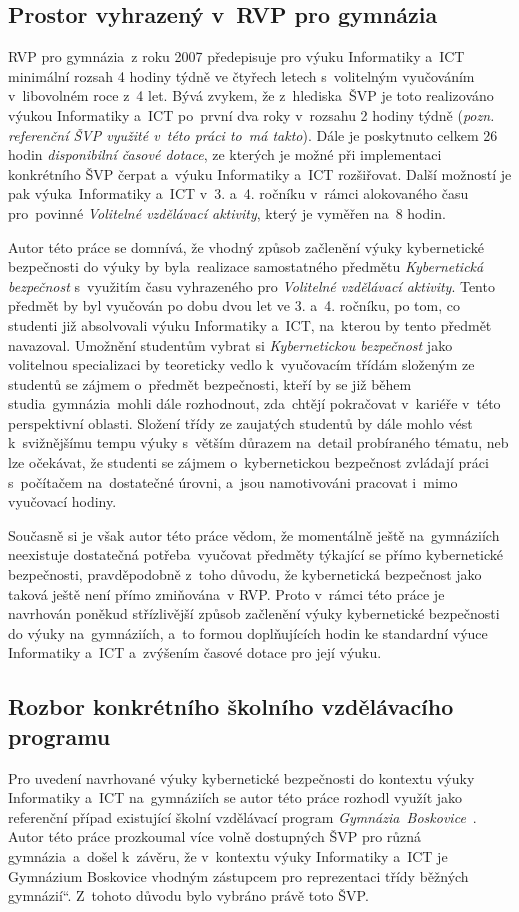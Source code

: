 \documentclass[a4paper, 12pt]{article}
\providecommand{\uv}[1]{\quotedblbase #1\textquotedblleft}
\begin{document}
\subsection{Prostor vyhrazený v~RVP pro gymnázia}
RVP pro gymnázia~z roku 2007 předepisuje pro výuku Informatiky a~ICT  minimální rozsah 4 hodiny týdně ve čtyřech letech s~volitelným vyučováním v~libovolném roce z~4 let. Bývá zvykem, že z~hlediska~ŠVP je toto realizováno výukou Informatiky a~ICT po~první dva roky v~rozsahu 2 hodiny týdně (\textit{pozn. referenční ŠVP využité v~této práci to~má takto}). Dále je poskytnuto celkem 26 hodin \textit{disponibilní časové dotace}, ze kterých je možné při implementaci konkrétního ŠVP čerpat a~výuku Informatiky a~ICT rozšiřovat. Další možností je pak výuka~Informatiky a~ICT v~3. a~4. ročníku v~rámci alokovaného času pro~povinné \textit{Volitelné vzdělávací aktivity}, který je vyměřen na~8 hodin.

Autor této práce se domnívá, že vhodný způsob začlenění výuky kybernetické bezpečnosti do výuky by byla~realizace samostatného předmětu \textit{Kybernetická bezpečnost} s~využitím času vyhrazeného pro \textit{Volitelné vzdělávací aktivity}. Tento předmět by byl vyučován po dobu dvou let ve 3. a~4. ročníku, po tom, co studenti již absolvovali výuku Informatiky a~ICT, na~kterou by tento předmět navazoval. Umožnění studentům vybrat si \textit{Kybernetickou bezpečnost} jako volitelnou specializaci by teoreticky vedlo k~vyučovacím třídám složeným ze studentů se zájmem o~předmět bezpečnosti, kteří by se již během studia~gymnázia~mohli dále rozhodnout, zda~chtějí pokračovat v~kariéře v~této perspektivní oblasti. Složení třídy ze zaujatých studentů by dále mohlo vést k~svižnějšímu tempu výuky s~větším důrazem na~detail probíraného tématu, neb lze očekávat, že studenti se zájmem o~kybernetickou bezpečnost zvládají práci s~počítačem na~dostatečné 
úrovni, a~jsou namotivováni pracovat i~mimo vyučovací hodiny.

Současně si je však autor této práce vědom, že momentálně ještě na~gymnáziích neexistuje dostatečná potřeba~vyučovat předměty týkající se přímo kybernetické bezpečnosti, pravděpodobně z~toho důvodu, že kybernetická bezpečnost jako taková ještě není přímo zmiňována~v RVP. Proto v~rámci této práce je navrhován poněkud střízlivější způsob začlenění výuky kybernetické bezpečnosti do výuky na~gymnáziích, a~to formou doplňujících hodin ke standardní výuce Informatiky a~ICT a~zvýšením časové dotace pro její výuku.

\subsection{Rozbor konkrétního školního vzdělávacího programu}
Pro uvedení navrhované výuky kybernetické bezpečnosti do kontextu výuky Informatiky a~ICT na~gymnáziích se autor této práce rozhodl využít jako referenční případ existující školní vzdělávací program \textit{Gymnázia~Boskovice}~\cite{svpGymbos}. Autor této práce prozkoumal více volně dostupných ŠVP pro různá gymnázia~a~došel k~závěru, že v~kontextu výuky Informatiky a~ICT je Gymnázium Boskovice vhodným zástupcem pro reprezentaci třídy \uv{běžných gymnázií}. Z~tohoto důvodu bylo vybráno právě toto ŠVP.
\end{document}
